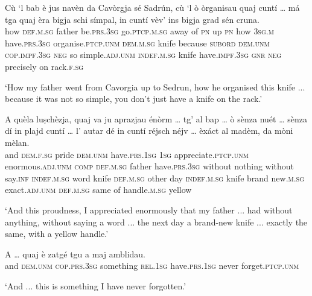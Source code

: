 \begin{linenumbers}
	\gll Cù `l bab è jus navèn da Cavòrgja sé Sadrún, cù `l ò òrganisau quaj cuntí … má tga quaj èra bigja schi símpal, in cuntí vèv’ ins bigja grad sén cruna.\\
	how \textsc{def.m.sg} father be.\textsc{prs.3sg} go.\textsc{ptcp.m.sg} away of \textsc{pn} up \textsc{pn} how \textsc{3sg.m} have.\textsc{prs.3sg} organise.\textsc{ptcp.unm} \textsc{dem.m.sg} knife {} because \textsc{subord} \textsc{dem.unm} \textsc{cop.impf.3sg} \textsc{neg} so simple.\textsc{adj.unm} \textsc{indef.m.sg} knife have.\textsc{impf.3sg} \textsc{gnr} \textsc{neg} precisely on rack.\textsc{f.sg}\\
\end{linenumbers}
\medskip
\glt `How my father went from Cavorgia up to Sedrun, how he organised this knife ... because it was not so simple, you don't just have a knife on the rack.'
\medskip

\largerpage
\begin{linenumbers}
	\gll A quèla luṣchèzja, quaj va ju aprazjau énòrm … tg’ al bap … ò sènza nuét … sènza dí in plajd\footnotemark{} cuntí … l’ autar dé in cuntí réjsch néjv … èxáct al madèm, da mòni mèlan.\\    and \textsc{dem.f.sg} pride \textsc{dem.unm} have.\textsc{prs.1sg} \textsc{1sg} appreciate.\textsc{ptcp.unm} enormous.\textsc{adj.unm} {} \textsc{comp} \textsc{def.m.sg} father {} have.\textsc{prs.3sg} without nothing {} without say.\textsc{inf} \textsc{indef.m.sg} word knife {} \textsc{def.m.sg} other day \textsc{indef.m.sg} knife brand new.\textsc{m.sg} {} exact.\textsc{adj.unm} \textsc{def.m.sg} same of handle.\textsc{m.sg} yellow\\
\end{linenumbers}
\clearpage
\glt `And this proudness, I appreciated enormously that my father ... had without anything, without saying a word ... the next day a brand-new knife ... exactly the same, with a yellow handle.'



\begin{linenumbers}
	\gll A … quaj è zatgé tgu a maj amblidau.   \\
and {} \textsc{dem.unm} \textsc{cop.prs.3sg} something \textsc{rel.1sg} have.\textsc{prs.1sg} never forget.\textsc{ptcp.unm}	\\
\end{linenumbers}
\medskip
\glt `And ... this is something I have never forgotten.'
\medskip



